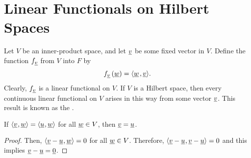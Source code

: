 \section{Linear Functionals on Hilbert Spaces}

Let $V$ be an inner-product space, and let $\underline{v}$ be some fixed vector in $V$.
Define the function $f_{\underline{v}}$ from $V$ into $F$ by
\begin{equation*}
f_{\underline{v}} \left( \underline{w} \right)
= {\left\langle  \underline{w}  \mskip2mu ,  \underline{v}  \right\rangle} .
\end{equation*}
Clearly, $f_{\underline{v}}$ is a linear functional on $V$.
If $V$ is a Hilbert space, then every continuous linear functional on $V$ arises in this way from some vector $\underline{v}$.
This result is known as the .

\begin{lemma} \label{lemma:DualSpaceSeparatesPoints}
If ${\langle  \underline{v}  \mskip1mu ,  \underline{w}  \rangle} = {\langle  \underline{u}  \mskip1mu ,  \underline{w}  \rangle}$ for all $\underline{w} \in V$, then $\underline{v} = \underline{u}$.
\end{lemma}
\begin{proof}
Then, ${\langle  \underline{v} - \underline{u}  \mskip1mu ,  \underline{w}  \rangle} = 0$ for all $\underline{w} \in V$.
Therefore, ${\langle  \underline{v} - \underline{u}  \mskip1mu ,  \underline{v} - \underline{u}  \rangle} = 0$ and this implies $\underline{v} - \underline{u} = \underline{0}$.
\end{proof}

